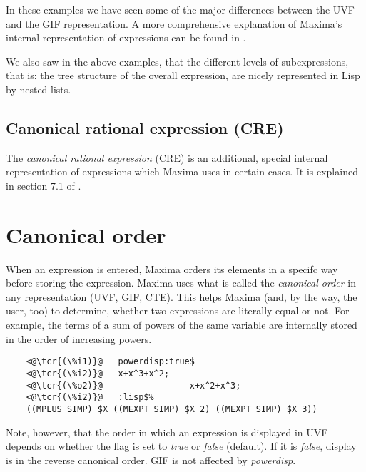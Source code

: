 \documentclass[../Maxima_Workbook.tex]{subfiles}
\begin{document}
\lz In these examples we have seen some of the major differences between the UVF and the GIF representation. A more comprehensive explanation of Maxima's internal representation of expressions can be found in \cite{FatemMGS}.

\lz We also saw in the above examples, that the different levels of subexpressions, that is: the tree structure of the overall expression, are nicely represented in Lisp by nested lists.

\subsection{Canonical rational expression (CRE)}\label{Ex3}  

The \emph{canonical rational expression} (CRE) is an additional, special internal representation of expressions which Maxima uses in certain cases. It is explained in section 7.1 of \cite[11-12]{FatemMGS}.

\section{Canonical order}\label{Ex2}

When an expression is entered, Maxima orders its elements in a specifc way before storing the expression. Maxima uses what is called the \emph{canonical order} in any representation (UVF, GIF, CTE). This helps Maxima (and, by the way, the user, too) to determine, whether two expressions are literally equal or not. For example, the terms of a sum of powers of the same variable are internally stored in the order of increasing powers.

\lz \begin{small}
	\color{blue}
	\begin{lstlisting}
	<@\tcr{(\%i1)}@   powerdisp:true$
	<@\tcr{(\%i2)}@   x+x^3+x^2;
	<@\tcr{(\%o2)}@			        x+x^2+x^3;
	<@\tcr{(\%i2)}@   :lisp$%
	((MPLUS SIMP) $X ((MEXPT SIMP) $X 2) ((MEXPT SIMP) $X 3))
	\end{lstlisting}
	\color{black}
\end{small}

\lz Note, however, that the order in which an expression is displayed in UVF depends on whether the flag  is set to \emph{true} or \emph{false} (default). If it is \emph{false}, display is in the reverse canonical order. GIF is not affected by \emph{powerdisp}.
\end{document}
